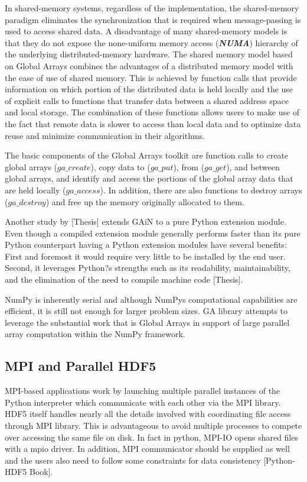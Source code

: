 In shared-memory systems, regardless of the implementation, the shared-memory paradigm eliminates the synchronization that is required when message-passing is used to access shared data. 
A disadvantage of many shared-memory models is that they do not expose the none-uniform memory access (\textbf{\textit{NUMA}}) hierarchy of the underlying distributed-memory hardware. 
The shared memory model based on Global Arrays combines the advantages of a distributed memory model with the ease of use of shared memory. 
This is achieved by function calls that provide information on which portion of the distributed data is held locally and the use of explicit calls to functions that transfer data between a shared address space and local storage. 
The combination of these functions allows users to make use of the fact that remote data is slower to access than local data and to optimize data reuse and minimize communication in their algorithms.

The basic components of the Global Arrays toolkit are function calls to create global arrays ($ga\_create$), copy data to ($ga\_put$), from ($ga\_get$), and between global arrays, and identify and access the portions of the global array data that are held locally ($ga\_access$). 
In addition, there are also functions to destroy arrays ($ga\_destroy$) and free up the memory originally allocated to them.

Another study by [Thesis] extends GAiN to a pure Python extension module.
Even though a compiled extension module generally performs faster than its pure Python counterpart having a Python extension modules have several benefits:
First and foremost it would require very little to be installed by the end user. 
Second, it leverages Python?s strengths such as its readability, maintainability, and the elimination of the need to compile machine code [Thesis]. 

NumPy is inherently serial and although NumPy\textquotesingle s computational capabilities are efficient, it is still not enough for larger problem sizes. 
GA library attempts to leverage the substantial work that is Global Arrays in support of large parallel array computation within the NumPy framework.

\subsection{MPI and Parallel HDF5}
MPI-based applications work by launching multiple parallel instances of the Python interpreter which communicate with each other via the MPI library. 
HDF5 itself handles nearly all the details involved with coordinating file access through MPI library.
This is advantageous to avoid multiple processes to compete over accessing the same file on disk. 
In fact in python, MPI-IO opens shared files with a mpio driver. 
In addition,  MPI communicator should be supplied as well and the users also need to follow some constraints for data consistency [Python- HDF5 Book].

